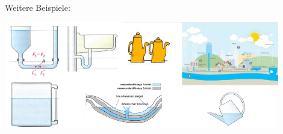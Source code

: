 \documentclass[11pt]{article}
\begin{document}
\vspace{0.5cm}

Weitere Beispiele:
\begin{center}
    \includegraphics[width=0.9\textwidth]{images/Beispiele_hydroParadoxon.jpg}
\end{center}

\newpage
\end{document}
